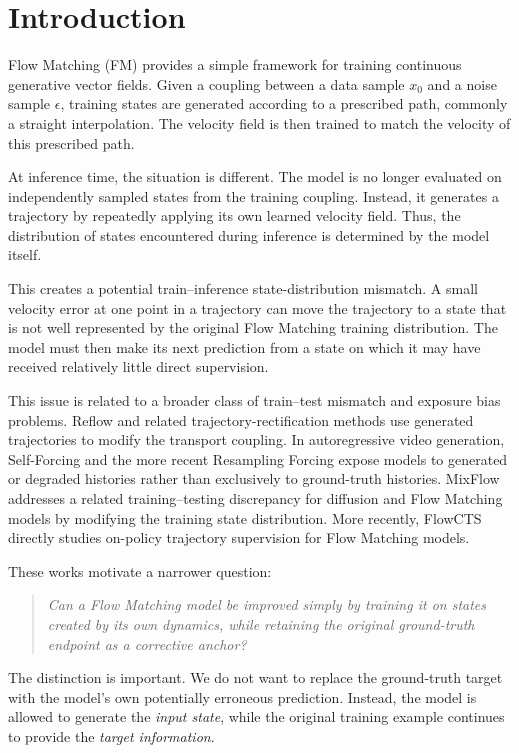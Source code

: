 \documentclass[11pt]{article}
\begin{document}
\section{Introduction}

Flow Matching (FM) provides a simple framework for training continuous
generative vector fields. Given a coupling between a data sample $x_0$ and a
noise sample $\epsilon$, training states are generated according to a
prescribed path, commonly a straight interpolation. The velocity field is then
trained to match the velocity of this prescribed path.

At inference time, the situation is different. The model is no longer
evaluated on independently sampled states from the training coupling. Instead,
it generates a trajectory by repeatedly applying its own learned velocity
field. Thus, the distribution of states encountered during inference is
determined by the model itself.

This creates a potential train--inference state-distribution mismatch. A small
velocity error at one point in a trajectory can move the trajectory to a state
that is not well represented by the original Flow Matching training
distribution. The model must then make its next prediction from a state on
which it may have received relatively little direct supervision.

This issue is related to a broader class of train--test mismatch and exposure
bias problems. Reflow and related trajectory-rectification methods use
generated trajectories to modify the transport coupling. In autoregressive
video generation, Self-Forcing and the more recent Resampling Forcing expose
models to generated or degraded histories rather than exclusively to
ground-truth histories. MixFlow addresses a related training--testing
discrepancy for diffusion and Flow Matching models by modifying the training
state distribution. More recently, FlowCTS directly studies on-policy
trajectory supervision for Flow Matching models.

These works motivate a narrower question:

\begin{quote}
\emph{Can a Flow Matching model be improved simply by training it on states
created by its own dynamics, while retaining the original ground-truth
endpoint as a corrective anchor?}
\end{quote}

The distinction is important. We do not want to replace the ground-truth target
with the model's own potentially erroneous prediction. Instead, the model is
allowed to generate the \emph{input state}, while the original training
example continues to provide the \emph{target information}.
\end{document}
